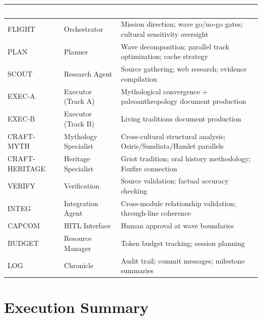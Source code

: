 \documentclass[11pt,letterpaper]{article}
\newcommand{\tableheader}[1]{\textbf{\sffamily\textcolor{white}{#1}}}
\begin{document}
\begin{center}
\begin{tabularx}{\textwidth}{L{2cm}L{2.5cm}X}
\toprule
{}
\tableheader{Role} & \tableheader{Agent} & \tableheader{Responsibility} \\
\midrule
FLIGHT & Orchestrator & Mission direction; wave go/no-go gates; cultural sensitivity oversight \\
PLAN & Planner & Wave decomposition; parallel track optimization; cache strategy \\
SCOUT & Research Agent & Source gathering; web research; evidence compilation \\
EXEC-A & Executor (Track A) & Mythological convergence + paleoanthropology document production \\
EXEC-B & Executor (Track B) & Living traditions document production \\
CRAFT-MYTH & Mythology Specialist & Cross-cultural structural analysis; Osiris/Sundiata/Hamlet parallels \\
CRAFT-HERITAGE & Heritage Specialist & Griot tradition; oral history methodology; Foxfire connection \\
VERIFY & Verification & Source validation; factual accuracy checking \\
INTEG & Integration Agent & Cross-module relationship validation; through-line coherence \\
CAPCOM & HITL Interface & Human approval at wave boundaries \\
BUDGET & Resource Manager & Token budget tracking; session planning \\
LOG & Chronicle & Audit trail; commit messages; milestone summaries \\
\bottomrule
\end{tabularx}
\end{center}

\section{Execution Summary}
\end{document}
